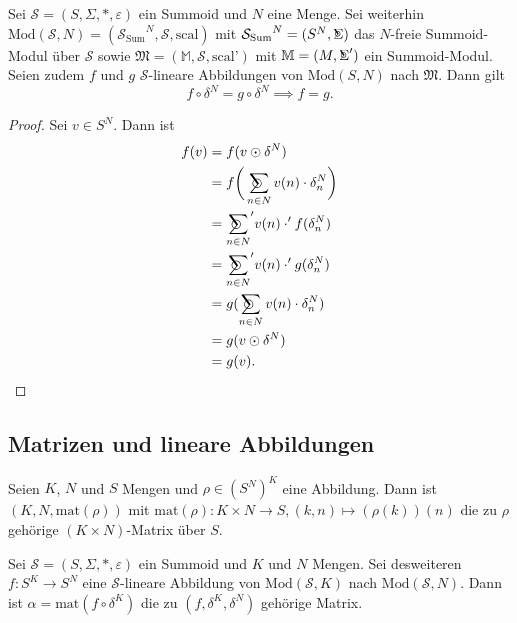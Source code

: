 \documentclass{article}
\DeclareMathOperator*{\Sigmacirc}{%
  \ThisStyle{\mathop{\ensurestackMath{\stackinset{c}{-0.75\LMpt}{c}{}{%
  \rotatebox[origin=lb]{-90}{$\circ$}}{\SavedStyle\Sigma}}}}}
\DeclareMathOperator*{\sumcirc}{%
  \ThisStyle{\mathop{\ensurestackMath{\stackinset{c}{-1.5\LMpt}{c}{}{%
  \rotatebox[origin=lb]{-90}{$\SavedStyle\scalerel*{\bm\Circle}{%
  i}$}}{\SavedStyle\sum}}}}}
\begin{document}
\begin{theorem}
  Sei $\mathcal{S} = (S, \Sigma, \ast, \varepsilon)$ ein Summoid und $N$ eine Menge.
  Sei weiterhin $\text{Mod}(\mathcal{S}, N) = ({\mathcal{S}_\text{Sum}}^N, \mathcal{S}, \text{scal})$
  mit ${\mathcal{S}_\text{Sum}}^N = (S^N, \Sigmacirc)$ das $N$-freie Summoid-Modul über $\mathcal{S}$
  sowie $\mathfrak{M} = (\mathbb{M}, \mathcal{S}, \text{scal'})$
  mit $\mathbb{M} = (M, \Sigmacirc')$ ein Summoid-Modul.
  Seien zudem $f$ und $g$ $\mathcal{S}$-lineare Abbildungen von $\text{Mod}(S, N)$ nach $\mathfrak{M}$.
  Dann gilt
  \begin{equation*}
    f \circ \delta^N = g \circ \delta^N \implies f = g.
  \end{equation*}
\end{theorem}
\begin{proof}
  Sei $v \in S^N$. Dann ist
  \begin{align*}
    f(v) 
    &= f(v \odot \delta^N) \\
    &= f\bigg(\sumcirc_{n \in N}v(n) \cdot \delta^N_n\bigg) \\
    &= {\sumcirc_{n \in N}}' v(n) \cdot' f(\delta^N_n) \\
    &= {\sumcirc_{n \in N}}' v(n) \cdot' g(\delta^N_n) \\
    &= g(\sumcirc_{n \in N} v(n) \cdot \delta^N_n) \\
    &= g(v \odot \delta^N) \\
    &= g(v). 
  \end{align*}
\end{proof}

\subsection{Matrizen und lineare Abbildungen}

\begin{definition}
  Seien $K$, $N$ und $S$ Mengen und $\rho \in (S^N)^K$ eine Abbildung.
  Dann ist $(K, N, \text{mat}(\rho))$ mit $\text{mat}(\rho) \colon K \times N \to S, (k, n) \mapsto (\rho(k))(n)$
  die zu $\rho$ gehörige $(K \times N)$-Matrix über $S$.
\end{definition}

\begin{definition}
  Sei $\mathcal{S} = (S, \Sigma, \ast, \varepsilon)$ ein Summoid
  und $K$ und $N$ Mengen.
  Sei desweiteren $f \colon S^K \to S^N$ eine $\mathcal{S}$-lineare
  Abbildung von $\text{Mod}(\mathcal{S}, K)$ nach $\text{Mod}(\mathcal{S}, N)$.
  Dann ist $\alpha = \text{mat}(f \circ \delta^K)$
  die zu $(f, \delta^K, \delta^N)$ gehörige Matrix.
\end{definition}
\end{document}
